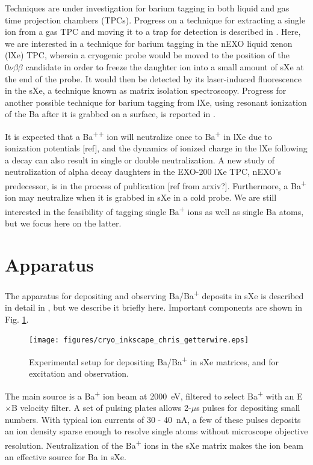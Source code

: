 \documentclass[aps,pra,reprint,superscriptaddress]{revtex4-1}
\begin{document}
Techniques are under investigation for barium tagging in both liquid and gas time projection chambers (TPCs).  Progress on a technique for extracting a single ion from a gas TPC and moving it to a trap for detection is described in \cite{Brunner2015}.  Here, we are interested in a technique for barium tagging in the nEXO liquid xenon (lXe) TPC, wherein a cryogenic probe would be moved to the position of the $0\nu\beta\beta$ candidate in order to freeze the daughter ion into a small amount of sXe at the end of the probe.  It would then be detected by its laser-induced fluorescence in the sXe, a technique known as matrix isolation spectroscopy.  Progress for another possible technique for barium tagging from lXe, using resonant ionization of the Ba after it is grabbed on a surface, is reported in \cite{Twelker2014}.

It is expected that a Ba\textsuperscript{++} ion will neutralize once to Ba\textsuperscript{+} in lXe due to ionization potentials [ref], and the dynamics of ionized charge in the lXe following a decay can also result in single or double neutralization.  A new study of neutralization of alpha decay daughters in the EXO-200 lXe TPC, nEXO's predecessor, is in the process of publication [ref from arxiv?].  Furthermore, a Ba\textsuperscript{+} ion may neutralize when it is grabbed in sXe in a cold probe.  We are still interested in the feasibility of tagging single Ba\textsuperscript{+} ions as well as single Ba atoms, but we focus here on the latter.

\section{Apparatus}

The apparatus for depositing and observing Ba/Ba\textsuperscript{+} deposits in sXe is described in detail in \cite{Mong2015}, but we describe it briefly here.  Important components are shown in Fig. \ref{fig:apparatus}.

\begin{figure}
\texttt{[image: figures/cryo\_inkscape\_chris\_getterwire.eps]}
\caption{Experimental setup for depositing Ba/Ba\textsuperscript{+} in sXe matrices, and for excitation and observation.}
\label{fig:apparatus}
\end{figure}

The main source is a Ba\textsuperscript{+} ion beam at 2000~eV, filtered to select Ba\textsuperscript{+} with an E$\times$B velocity filter.  A set of pulsing plates allows 2-$\mu$s pulses for depositing small numbers.  With typical ion currents of 30 - 40~nA, a few of these pulses deposits an ion density sparse enough to resolve single atoms without microscope objective resolution.  Neutralization of the Ba\textsuperscript{+} ions in the sXe matrix makes the ion beam an effective source for Ba in sXe.
\end{document}
